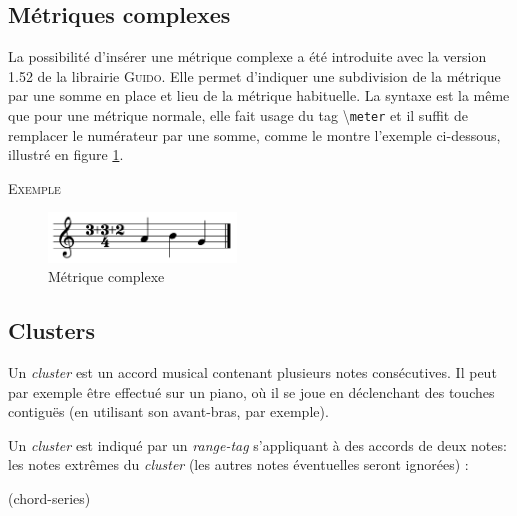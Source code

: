 \documentclass{article}
\newenvironment{gmncode}	{\vspace{-2mm}\small\verbatim}{\endverbatim\vspace{-2mm}}
\newcommand{\guido}			{\textsc{Guido}}
\newcommand{\code}[1]		{{\small \texttt{#1}}}
\newcommand{\guidotag}[1]	{\textbackslash\code{#1}}
\newcommand{\exemple}		{\vspace{2mm}\hspace*{-6mm}\textsc{Exemple}}
\begin{document}
\subsection{Métriques complexes}\label{subsec:metriques}

La possibilité d'insérer une métrique complexe a été introduite avec la version 1.52 de la librairie \guido. Elle permet d'indiquer une subdivision de la métrique par une somme en place et lieu de la métrique habituelle. La syntaxe est la même que pour une métrique normale, elle fait usage du tag \guidotag{meter} et il suffit de remplacer le numérateur par une somme, comme le montre l'exemple ci-dessous, illustré en figure \ref{fig:complexMeter}.

\exemple\\
\begin{gmncode}
  [ \meter<"3+3+2/4"> a b g ]
\end{gmncode}

\begin{figure}[h]
\centering
\includegraphics[width=50mm]{img/partitions/complexMeter.pdf}
\caption{Métrique complexe}
\label{fig:complexMeter}
\end{figure}

\subsection{Clusters}\label{subsec:clusters}

Un \emph{cluster} est un accord musical contenant plusieurs notes consécutives. Il peut par exemple être effectué sur un piano, où il se joue en déclenchant des touches contiguës (en utilisant son avant-bras, par exemple).

Un \emph{cluster} est indiqué par un \emph{range-tag} s'appliquant à des accords de deux notes: les notes extrêmes du \emph{cluster} (les autres notes éventuelles seront ignorées) :

\begin{gmncode}
(chord-series)
\end{gmncode}
\end{document}
